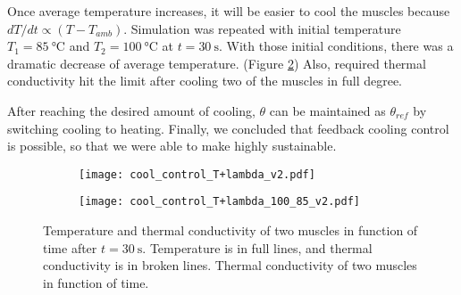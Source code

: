 Once average temperature increases, it will be easier to cool the muscles because $dT/dt \propto (T-T_{amb})$. Simulation was repeated with initial temperature $T_{1}=\SI{85}{\degreeCelsius}$ and $T_{2}=\SI{100}{\degreeCelsius}$ at $t=\SI{30}{\second}$. With those initial conditions, there was a dramatic decrease of average temperature. (Figure \ref{cool_control_100}) Also, required thermal conductivity hit the limit after cooling two of the muscles in full degree. 

After reaching the desired amount of cooling, $ \theta $ can be maintained as $\theta_{ref}$ by switching cooling to heating. Finally, we concluded that feedback cooling control is possible, so that we were able to make \apc highly sustainable.

\begin{figure}[t]
	\centering
	\begin{subfigure}[t]{0.45\textwidth}
		\centering\texttt{[image: cool\_control\_T+lambda\_v2.pdf]}
		\caption{\label{cool_control}}
	\end{subfigure}%
	\begin{subfigure}[t]{0.45\textwidth}
		\centering\texttt{[image: cool\_control\_T+lambda\_100\_85\_v2.pdf]}
		\caption{\label{cool_control_100}}
	\end{subfigure}
	\caption[Sustainable closed-loop \apc simulation]{ Temperature and thermal conductivity of two muscles in function of time after $t=\SI{30}{\second}$. Temperature is in full lines, and thermal conductivity is in broken lines.  Thermal conductivity of two muscles in function of time. }
	\label{cool_simulation}
\end{figure}




